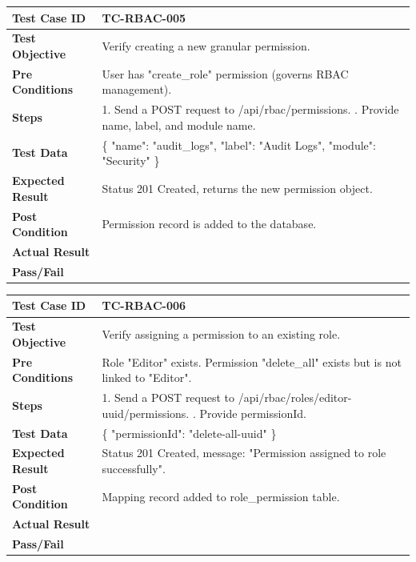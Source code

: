 \begin{longtable}{|p{}|p{}|}
\hline
\textbf{Test Case ID} & TC-RBAC-005 \\ \hline
\textbf{Test Objective} & Verify creating a new granular permission. \\ \hline
\textbf{Pre Conditions} & User has "create_role" permission (governs RBAC management). \\ \hline
\textbf{Steps} & 
1. Send a POST request to /api/rbac/permissions. \newline
2. Provide name, label, and module name. \\ \hline
\textbf{Test Data} & \{ "name": "audit_logs", "label": "Audit Logs", "module": "Security" \} \\ \hline
\textbf{Expected Result} & Status 201 Created, returns the new permission object. \\ \hline
\textbf{Post Condition} & Permission record is added to the database. \\ \hline
\textbf{Actual Result} &  \\ \hline
\textbf{Pass/Fail} &  \\ \hline
\end{longtable}

\begin{longtable}{|p{}|p{}|}
\hline
\textbf{Test Case ID} & TC-RBAC-006 \\ \hline
\textbf{Test Objective} & Verify assigning a permission to an existing role. \\ \hline
\textbf{Pre Conditions} & Role "Editor" exists. Permission "delete_all" exists but is not linked to "Editor". \\ \hline
\textbf{Steps} & 
1. Send a POST request to /api/rbac/roles/editor-uuid/permissions. \newline
2. Provide permissionId. \\ \hline
\textbf{Test Data} & \{ "permissionId": "delete-all-uuid" \} \\ \hline
\textbf{Expected Result} & Status 201 Created, message: "Permission assigned to role successfully". \\ \hline
\textbf{Post Condition} & Mapping record added to role\_permission table. \\ \hline
\textbf{Actual Result} &  \\ \hline
\textbf{Pass/Fail} &  \\ \hline
\end{longtable}

